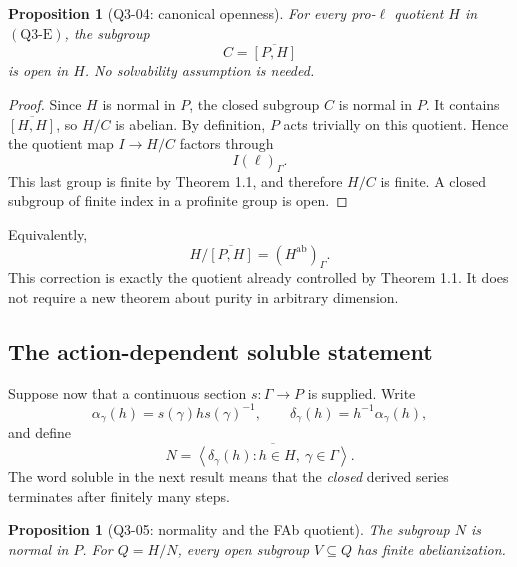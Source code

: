 \documentclass[11pt,a4paper]{article}
\newtheorem{proposition}[theorem]{Proposition}
\theoremstyle{remark}
\begin{document}
\begin{proposition}[Q3-04: canonical openness]
\label{q3:canonical}
For every pro-\(\ell\) quotient \(H\) in
\((\mathrm{Q3\text{-}E})\), the subgroup
\[
C=\overline{[P,H]}
\]
is open in \(H\).  No solvability assumption is needed.
\end{proposition}

\begin{proof}
Since \(H\) is normal in \(P\), the closed subgroup \(C\) is normal
in \(P\).  It contains \(\overline{[H,H]}\), so \(H/C\) is abelian.
By definition, \(P\) acts trivially on this quotient.  Hence the
quotient map \(I\to H/C\) factors through
\[
I(\ell)_\Gamma.
\]
This last group is finite by Theorem 1.1, and therefore \(H/C\) is
finite.  A closed subgroup of finite index in a profinite group is
open.
\end{proof}

Equivalently,
\[
H/\overline{[P,H]}=(H^{\mathrm{ab}})_\Gamma.
\]
This correction is exactly the quotient already controlled by
Theorem 1.1.  It does not require a new theorem about purity in
arbitrary dimension.

\subsection{The action-dependent soluble statement}

Suppose now that a continuous section \(s:\Gamma\to P\) is supplied.
Write
\[
\alpha_\gamma(h)=s(\gamma)h s(\gamma)^{-1},\qquad
\delta_\gamma(h)=h^{-1}\alpha_\gamma(h),
\]
and define
\[
N=\overline{\left\langle
 \delta_\gamma(h):h\in H,\ \gamma\in\Gamma
\right\rangle}.
\]
The word soluble in the next result means that the \emph{closed}
derived series terminates after finitely many steps.

\begin{proposition}[Q3-05: normality and the FAb quotient]
\label{q3:fab}
The subgroup \(N\) is normal in \(P\).  For \(Q=H/N\), every open
subgroup \(V\subseteq Q\) has finite abelianization.
\end{proposition}
\end{document}
